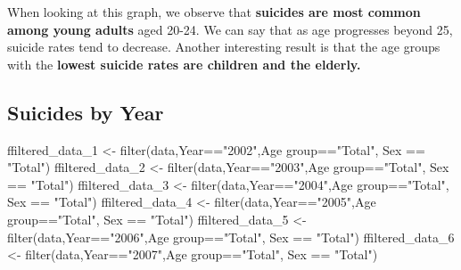 \documentclass[
  11pt,
  a4paper,
  DIV=11,
  numbers=noendperiod]{scrartcl}
\newenvironment{Shaded}{\begin{snugshade}}{\end{snugshade}}
\newcommand{\AttributeTok}[1]{\textcolor[rgb]{0.40,0.45,0.13}{#1}}
\newcommand{\FunctionTok}[1]{\textcolor[rgb]{0.28,0.35,0.67}{#1}}
\newcommand{\NormalTok}[1]{\textcolor[rgb]{0.00,0.23,0.31}{#1}}
\newcommand{\OtherTok}[1]{\textcolor[rgb]{0.00,0.23,0.31}{#1}}
\newcommand{\SpecialCharTok}[1]{\textcolor[rgb]{0.37,0.37,0.37}{#1}}
\newcommand{\StringTok}[1]{\textcolor[rgb]{0.13,0.47,0.30}{#1}}
\begin{document}
When looking at this graph, we observe that \textbf{suicides are most
common among young adults} aged 20-24. We can say that as age progresses
beyond 25, suicide rates tend to decrease. Another interesting result is
that the age groups with the \textbf{lowest suicide rates are children
and the elderly.}

\hypertarget{suicides-by-year}{%
\subsection{\texorpdfstring{\textbf{Suicides by
Year}}{Suicides by Year}}\label{suicides-by-year}}

\begin{Shaded}
\begin{Highlighting}[]
\NormalTok{ffiltered\_data\_1 }\OtherTok{\textless{}{-}} \FunctionTok{filter}\NormalTok{(data,Year}\SpecialCharTok{==}\StringTok{"2002"}\NormalTok{,}\StringTok{\textasciigrave{}}\AttributeTok{Age group}\StringTok{\textasciigrave{}}\SpecialCharTok{==}\StringTok{"Total"}\NormalTok{, Sex }\SpecialCharTok{==} \StringTok{"Total"}\NormalTok{)}
\NormalTok{ffiltered\_data\_2 }\OtherTok{\textless{}{-}} \FunctionTok{filter}\NormalTok{(data,Year}\SpecialCharTok{==}\StringTok{"2003"}\NormalTok{,}\StringTok{\textasciigrave{}}\AttributeTok{Age group}\StringTok{\textasciigrave{}}\SpecialCharTok{==}\StringTok{"Total"}\NormalTok{, Sex }\SpecialCharTok{==} \StringTok{"Total"}\NormalTok{)}
\NormalTok{ffiltered\_data\_3 }\OtherTok{\textless{}{-}} \FunctionTok{filter}\NormalTok{(data,Year}\SpecialCharTok{==}\StringTok{"2004"}\NormalTok{,}\StringTok{\textasciigrave{}}\AttributeTok{Age group}\StringTok{\textasciigrave{}}\SpecialCharTok{==}\StringTok{"Total"}\NormalTok{, Sex }\SpecialCharTok{==} \StringTok{"Total"}\NormalTok{)}
\NormalTok{ffiltered\_data\_4 }\OtherTok{\textless{}{-}} \FunctionTok{filter}\NormalTok{(data,Year}\SpecialCharTok{==}\StringTok{"2005"}\NormalTok{,}\StringTok{\textasciigrave{}}\AttributeTok{Age group}\StringTok{\textasciigrave{}}\SpecialCharTok{==}\StringTok{"Total"}\NormalTok{, Sex }\SpecialCharTok{==} \StringTok{"Total"}\NormalTok{)}
\NormalTok{ffiltered\_data\_5 }\OtherTok{\textless{}{-}} \FunctionTok{filter}\NormalTok{(data,Year}\SpecialCharTok{==}\StringTok{"2006"}\NormalTok{,}\StringTok{\textasciigrave{}}\AttributeTok{Age group}\StringTok{\textasciigrave{}}\SpecialCharTok{==}\StringTok{"Total"}\NormalTok{, Sex }\SpecialCharTok{==} \StringTok{"Total"}\NormalTok{)}
\NormalTok{ffiltered\_data\_6 }\OtherTok{\textless{}{-}} \FunctionTok{filter}\NormalTok{(data,Year}\SpecialCharTok{==}\StringTok{"2007"}\NormalTok{,}\StringTok{\textasciigrave{}}\AttributeTok{Age group}\StringTok{\textasciigrave{}}\SpecialCharTok{==}\StringTok{"Total"}\NormalTok{, Sex }\SpecialCharTok{==} \StringTok{"Total"}\NormalTok{)}

\end{Highlighting}
\end{Shaded}
\end{document}
